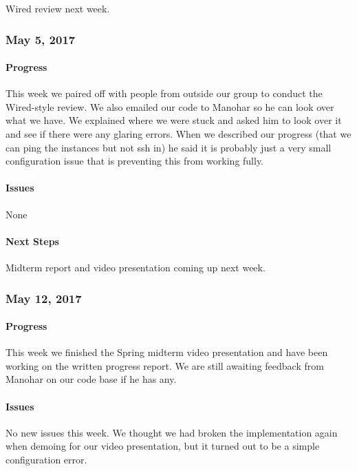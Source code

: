 \documentclass[10pt,onecolumn,journal,draftclsnofoot]{IEEEtran}
\begin{document}
Wired review next week.

\subsubsection{May 5, 2017} 

\paragraph{Progress} 

This week we paired off with people from outside our group to conduct
the Wired-style review. We also emailed our code to Manohar so he can
look over what we have. We explained where we were stuck and asked him
to look over it and see if there were any glaring errors. When we
described our progress (that we can ping the instances but not ssh in)
he said it is probably just a very small configuration issue that is
preventing this from working fully.

\paragraph{Issues} 

None

\paragraph{Next Steps} 

Midterm report and video presentation coming up next week.

\subsubsection{May 12, 2017} 

\paragraph{Progress} 

This week we finished the Spring midterm video presentation and have
been working on the written progress report. We are still awaiting
feedback from Manohar on our code base if he has any.

\paragraph{Issues} 

No new issues this week. We thought we had broken the implementation
again when demoing for our video presentation, but it turned out to be a
simple configuration error.
\end{document}
